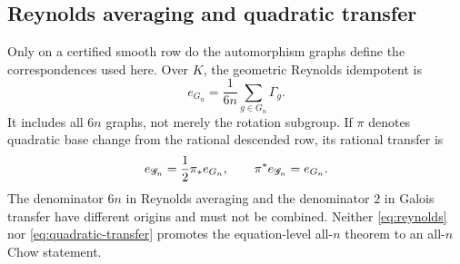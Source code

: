 \subsection{Reynolds averaging and quadratic transfer}

Only on a certified smooth row do the automorphism graphs define the
correspondences used here.  Over \(K\), the geometric Reynolds idempotent is
\begin{equation}
e_{G_n}=\frac{1}{6n}\sum_{g\in G_n}\Gamma_g.
\label{eq:reynolds}
\end{equation}
It includes all \(6n\) graphs, not merely the rotation subgroup.  If
\(\pi\) denotes quadratic base change from the rational descended row, its
rational transfer is
\begin{equation}
e_{\mathscr G_n}=\frac12\pi_*e_{G_n},\qquad
\pi^*e_{\mathscr G_n}=e_{G_n}.
\label{eq:quadratic-transfer}
\end{equation}
The denominator \(6n\) in Reynolds averaging and the denominator \(2\)
in Galois transfer have different origins and must not be combined.  Neither
\eqref{eq:reynolds} nor \eqref{eq:quadratic-transfer} promotes the
equation-level all-\(n\) theorem to an all-\(n\) Chow statement.
